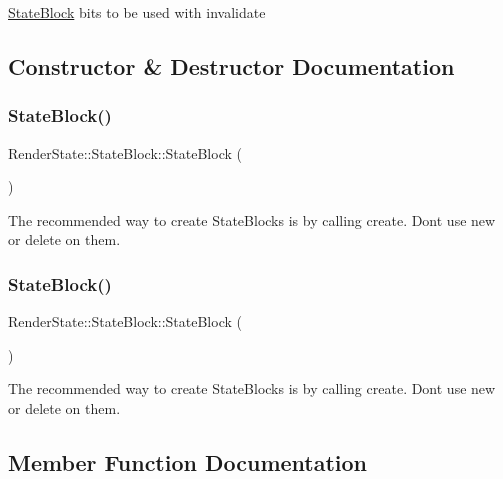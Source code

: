 \hyperlink{classRenderState_1_1StateBlock}{State\+Block} bits to be used with invalidate 

\subsection{Constructor \& Destructor Documentation}
\mbox{\label{classRenderState_1_1StateBlock_ad40095d868f989d391b039c4a470b87d}} 
\subsubsection{\texorpdfstring{State\+Block()}{StateBlock()}\hspace{0.1cm}{\footnotesize\ttfamily [1/2]}}
{\footnotesize\ttfamily Render\+State\+::\+State\+Block\+::\+State\+Block (\begin{DoxyParamCaption}{ }\end{DoxyParamCaption})}

The recommended way to create State\+Blocks is by calling {\ttfamily create}. Don\textquotesingle{}t use {\ttfamily new} or {\ttfamily delete} on them. \mbox{\label{classRenderState_1_1StateBlock_ad40095d868f989d391b039c4a470b87d}} 
\subsubsection{\texorpdfstring{State\+Block()}{StateBlock()}\hspace{0.1cm}{\footnotesize\ttfamily [2/2]}}
{\footnotesize\ttfamily Render\+State\+::\+State\+Block\+::\+State\+Block (\begin{DoxyParamCaption}{ }\end{DoxyParamCaption})}

The recommended way to create State\+Blocks is by calling {\ttfamily create}. Don\textquotesingle{}t use {\ttfamily new} or {\ttfamily delete} on them. 

\subsection{Member Function Documentation}
\mbox{\label{classRenderState_1_1StateBlock_a045055d7b3f19710d52f2a00900fec50}} 
